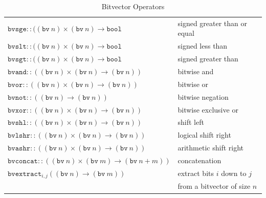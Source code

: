 \documentclass[11pt,twoside,fleqn,openright,titlepage]{cslreport}
\begin{document}
\begin{table}
\begin{tabular}{|l|l|}
$\mathtt{bvsge}::((\mathtt{bv}\ n)\times (\mathtt{bv}\ n) \rightarrow \mathtt{bool}$ &
signed greater than or equal\\
$\mathtt{bvslt}::((\mathtt{bv}\ n)\times (\mathtt{bv}\ n) \rightarrow \mathtt{bool}$ &
signed less than\\
$\mathtt{bvsgt}::((\mathtt{bv}\ n)\times (\mathtt{bv}\ n) \rightarrow \mathtt{bool}$ &
signed greater than\\
\hline
$\mathtt{bvand}::((\mathtt{bv}\ n)\times (\mathtt{bv}\ n) \rightarrow (\mathtt{bv}\ n))$ &
bitwise and\\
$\mathtt{bvor}::((\mathtt{bv}\ n)\times (\mathtt{bv}\ n) \rightarrow (\mathtt{bv}\ n))$ &
bitwise or\\
$\mathtt{bvnot}::((\mathtt{bv}\ n) \rightarrow (\mathtt{bv}\ n))$ &
bitwise negation\\
$\mathtt{bvxor}::((\mathtt{bv}\ n)\times (\mathtt{bv}\ n) \rightarrow (\mathtt{bv}\ n))$ &
bitwise exclusive or\\
\hline
$\mathtt{bvshl}::((\mathtt{bv}\ n)\times (\mathtt{bv}\ n) \rightarrow (\mathtt{bv}\ n))$ &
shift left\\
$\mathtt{bvlshr}::((\mathtt{bv}\ n)\times (\mathtt{bv}\ n) \rightarrow (\mathtt{bv}\ n))$ &
logical shift right\\
$\mathtt{bvashr}::((\mathtt{bv}\ n)\times (\mathtt{bv}\ n) \rightarrow (\mathtt{bv}\ n))$ &
arithmetic shift right\\
\hline
$\mathtt{bvconcat}::((\mathtt{bv}\ n)\times (\mathtt{bv}\ m) \rightarrow (\mathtt{bv}\ n+m))$ &
concatenation \\
$\mathtt{bvextract}_{i,j}$$((\mathtt{bv}\ n) \rightarrow (\mathtt{bv}\ m))$ &
extract bits $i$ down to $j$ \\
& from a bitvector of size $n$ \\
\hline
\end{tabular}
\caption{Bitvector Operators}
\label{bitvectors}
\end{table}
\end{document}

